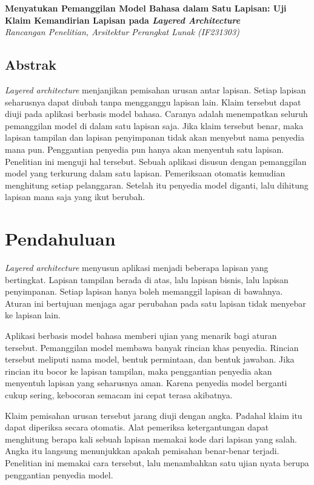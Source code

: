 \documentclass[11pt,a4paper]{article}
\begin{document}
\begin{center}
  {\LARGE\bfseries Menyatukan Pemanggilan Model Bahasa dalam Satu Lapisan: Uji Klaim Kemandirian Lapisan pada \textit{Layered Architecture}}\\[0.6em]
  {\small\itshape Rancangan Penelitian, Arsitektur Perangkat Lunak (IF231303)}
\end{center}

\vspace{1em}

\subsection*{Abstrak}

\textit{Layered architecture} menjanjikan pemisahan urusan antar lapisan. Setiap lapisan seharusnya dapat diubah tanpa mengganggu lapisan lain. Klaim tersebut dapat diuji pada aplikasi berbasis model bahasa. Caranya adalah menempatkan seluruh pemanggilan model di dalam satu lapisan saja. Jika klaim tersebut benar, maka lapisan tampilan dan lapisan penyimpanan tidak akan menyebut nama penyedia mana pun. Penggantian penyedia pun hanya akan menyentuh satu lapisan. Penelitian ini menguji hal tersebut. Sebuah aplikasi disusun dengan pemanggilan model yang terkurung dalam satu lapisan. Pemeriksaan otomatis kemudian menghitung setiap pelanggaran. Setelah itu penyedia model diganti, lalu dihitung lapisan mana saja yang ikut berubah.

\section{Pendahuluan}

\textit{Layered architecture} menyusun aplikasi menjadi beberapa lapisan yang bertingkat. Lapisan tampilan berada di atas, lalu lapisan bisnis, lalu lapisan penyimpanan. Setiap lapisan hanya boleh memanggil lapisan di bawahnya. Aturan ini bertujuan menjaga agar perubahan pada satu lapisan tidak menyebar ke lapisan lain.

Aplikasi berbasis model bahasa memberi ujian yang menarik bagi aturan tersebut. Pemanggilan model membawa banyak rincian khas penyedia. Rincian tersebut meliputi nama model, bentuk permintaan, dan bentuk jawaban. Jika rincian itu bocor ke lapisan tampilan, maka penggantian penyedia akan menyentuh lapisan yang seharusnya aman. Karena penyedia model berganti cukup sering, kebocoran semacam ini cepat terasa akibatnya.

Klaim pemisahan urusan tersebut jarang diuji dengan angka. Padahal klaim itu dapat diperiksa secara otomatis. Alat pemeriksa ketergantungan dapat menghitung berapa kali sebuah lapisan memakai kode dari lapisan yang salah. Angka itu langsung menunjukkan apakah pemisahan benar-benar terjadi. Penelitian ini memakai cara tersebut, lalu menambahkan satu ujian nyata berupa penggantian penyedia model.
\end{document}
